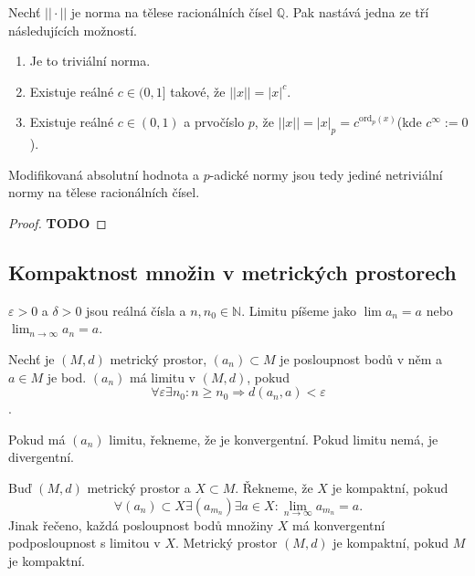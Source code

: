 \documentclass[../main.tex]{subfiles}
\begin{document}
\begin{theorem}[A. Ostrowski]
    Nechť $||\cdot||$ je norma na tělese racionálních čísel $\mathbb{Q}$. Pak nastává jedna ze tří následujících možností.
    \begin{enumerate}
        \item Je to triviální norma.
        \item Existuje reálné $c\in (0,1]$ takové, že $||x|| = |x|^c$.
        \item Existuje reálné $c \in (0,1)$ a prvočíslo $p$, že $||x|| = |x|_p = c^{\text{ord}_p(x)}$(kde $c^\infty := 0$).
    \end{enumerate}
    Modifikovaná absolutní hodnota a $p$-adické normy jsou tedy jediné netriviální
    normy na tělese racionálních čísel.
\end{theorem}
\begin{proof}
    \LARGE
    \textbf{TODO}
\end{proof}

\subsection{Kompaktnost množin v metrických prostorech}

\begin{remark}[Konvence]
    $\varepsilon > 0$ a $\delta > 0$ jsou reálná čísla a $n,n_0 \in \mathbb{N}$. Limitu píšeme jako
    $\lim a_n = a$ nebo $\lim_{n \to \infty} a_n = a$.
\end{remark}

\begin{definition}[Limita]
    Nechť je $(M,d)$ metrický prostor, $(a_n) \subset M$ je posloupnost bodů v něm a $a \in M$ je bod.
    $(a_n)$ má limitu v $(M,d)$, pokud
    \[ \forall \varepsilon \exists n_0: n \geq n_0 \Rightarrow d(a_n, a) < \varepsilon \].
\end{definition}

\begin{definition}
    Pokud má $(a_n)$ limitu, řekneme, že je konvergentní. Pokud limitu nemá, je divergentní.
\end{definition}

\begin{definition}
    Buď $(M,d)$ metrický prostor a $X \subset M$. Řekneme, že $X$ je kompaktní, pokud
    \[ \forall (a_n) \subset X  \exists (a_{m_n})  \exists a \in X: \lim_{n \to \infty } a_{m_n} = a. \]
    Jinak řečeno, každá posloupnost bodů množiny $X$ má konvergentní podposloupnost s limitou v $X$.
    Metrický prostor $(M,d)$ je kompaktní, pokud $M$ je kompaktní.
\end{definition}
\end{document}
